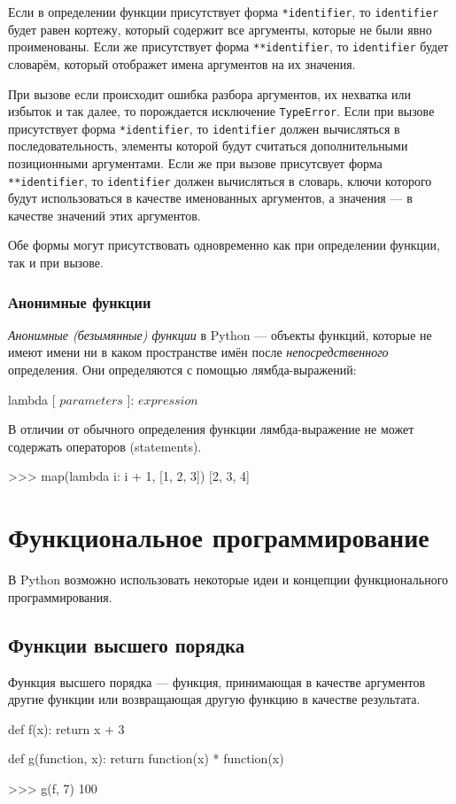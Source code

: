 Если в определении функции присутствует форма \lstinline{*identifier}, то \lstinline{identifier} будет равен кортежу, который содержит все аргументы, которые не были явно проименованы. Если же присутствует форма \lstinline{**identifier}, то \lstinline{identifier} будет словарём, который отображет имена аргументов на их значения.

При вызове если происходит ошибка разбора аргументов, их нехватка или избыток и так далее, то порождается исключение \lstinline{TypeError}. Если при вызове присутствует форма \lstinline{*identifier}, то \lstinline{identifier} должен вычисляться в последовательность, элементы которой будут считаться дополнительными позиционными аргументами. Если же при вызове присутсвует форма \lstinline{**identifier}, то \lstinline{identifier} должен вычисляться в словарь, ключи которого будут использоваться в качестве именованных аргументов, а значения --- в качестве значений этих аргументов.

Обе формы могут присутствовать одновременно как при определении функции, так и при вызове.

\subsubsection{Анонимные функции}
\emph{Анонимные (безымянные) функции} в Python --- объекты функций, которые не имеют имени ни в каком пространстве имён после \emph{непосредственного} определения. Они определяются с помощью лямбда-выражений:
\begin{pylst}{}{}
lambda [ $parameters$ ]: $expression$
\end{pylst}

В отличии от обычного определения функции лямбда-выражение не может содержать операторов (statements).
\begin{pylst}{}{}
>>> map(lambda i: i + 1, [1, 2, 3])
[2, 3, 4]
\end{pylst}

\section{Функциональное программирование}
В Python возможно использовать некоторые идеи и концепции функционального программирования.

\subsection{Функции высшего порядка}
Функция высшего порядка --- функция, принимающая в качестве аргументов другие функции или возвращающая другую функцию в качестве результата.
\begin{pylst}{}{}
def f(x):
    return x + 3
 
def g(function, x):
    return function(x) * function(x)
 
>>> g(f, 7)
100
\end{pylst}

